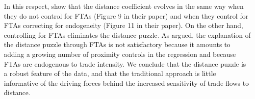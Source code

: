 \documentclass[12pt,twoside,a4paper,notitlepage]{article}
\begin{document}
In this respect, \cite{Bosquet2015} show that the distance coefficient evolves in the same way when they do not control for FTAs (Figure 
9 in their paper) and when they control for FTAs correcting for endogeneity (Figure 
11 in their paper).
On the other hand, controlling for FTAs eliminates the distance puzzle.
As argued, the explanation of the distance puzzle through FTAs is not satisfactory because it amounts to adding a growing number of proximity controls in the regression and because FTAs are endogenous to trade intensity.
We conclude that the distance puzzle is a robust feature of the data, and that the traditional approach is little informative of the driving forces behind the increased sensitivity of trade flows to distance.
 
\fi

\end{document}
